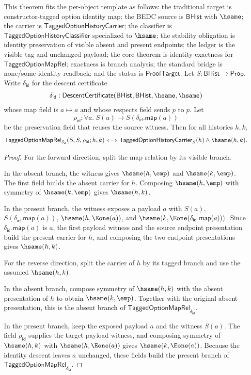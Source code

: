 \begin{theorem}
\label{thm:tagged-option-payload-descent-identity-exactness}
This theorem fits the per-object template as follows: the traditional target is
constructor-tagged option identity map; the BEDC source is $\mathsf{BHist}$ with
$\hsame$; the carrier is $\mathsf{TaggedOptionHistoryCarrier}$; the classifier
is $\mathsf{TaggedOptionHistoryClassifier}$ specialized to $\hsame$; the
stability obligation is identity preservation of visible absent and present
endpoints; the ledger is the visible tag and unchanged payload; the core theorem
is identity exactness for $\mathsf{TaggedOptionMapRel}$; exactness is branch
analysis; the standard bridge is none/some identity readback; and the status is
$\mathsf{ProofTarget}$. Let $S:\mathsf{BHist}\to\mathsf{Prop}$. Write
$\delta_{\mathsf{id}}$ for the descent certificate
$$
\delta_{\mathsf{id}}:
\mathsf{DescentCertificate}(\mathsf{BHist},\mathsf{BHist},\hsame,\hsame)
$$
whose map field is $a\mapsto a$ and whose respects field sends $p$ to $p$. Let
$$
\rho_{\mathsf{id}}:\forall a.\;S(a)\to S(\delta_{\mathsf{id}}.\mathsf{map}(a))
$$
be the preservation field that reuses the source witness. Then for all histories
$h,k$,
$$
\mathsf{TaggedOptionMapRel}_{\delta_{\mathsf{id}}}
(S,S,\rho_{\mathsf{id}};h,k)
\Longleftrightarrow
\mathsf{TaggedOptionHistoryCarrier}_S(h)\land\hsame(h,k).
$$
\end{theorem}
\begin{proof}
For the forward direction, split the map relation by its visible branch.

In the absent branch, the witness gives $\hsame(h,\emp)$ and $\hsame(k,\emp)$.
The first field builds the absent carrier for $h$. Composing $\hsame(h,\emp)$
with symmetry of $\hsame(k,\emp)$ gives $\hsame(h,k)$.

In the present branch, the witness exposes a payload $a$ with $S(a)$,
$S(\delta_{\mathsf{id}}.\mathsf{map}(a))$, $\hsame(h,\Eone(a))$, and
$\hsame(k,\Eone(\delta_{\mathsf{id}}.\mathsf{map}(a)))$. Since
$\delta_{\mathsf{id}}.\mathsf{map}(a)$ is $a$, the first payload witness and the
source endpoint presentation build the present carrier for $h$, and composing
the two endpoint presentations gives $\hsame(h,k)$.

For the reverse direction, split the carrier of $h$ by its tagged branch and use
the assumed $\hsame(h,k)$.

In the absent branch, compose symmetry of $\hsame(h,k)$ with the absent
presentation of $h$ to obtain $\hsame(k,\emp)$. Together with the original absent
presentation, this is the absent branch of
$\mathsf{TaggedOptionMapRel}_{\delta_{\mathsf{id}}}$.

In the present branch, keep the exposed payload $a$ and the witness $S(a)$.
The field $\rho_{\mathsf{id}}$ supplies the target payload witness, and
composing symmetry of $\hsame(h,k)$ with $\hsame(h,\Eone(a))$ gives
$\hsame(k,\Eone(a))$. Because the identity descent leaves $a$ unchanged, these
fields build the present branch of
$\mathsf{TaggedOptionMapRel}_{\delta_{\mathsf{id}}}$.
\end{proof}

